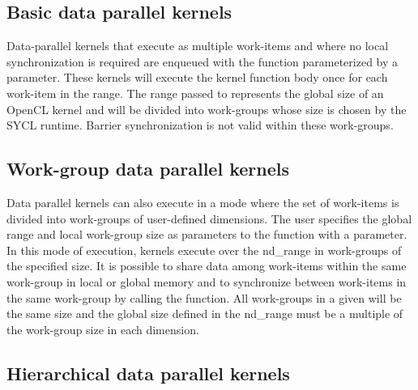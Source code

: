 \subsection{Basic data parallel kernels} 

Data-parallel kernels that execute as
multiple work-items and where no local synchronization is required are enqueued
with the  function parameterized by a
 parameter. These kernels will execute the kernel
function body once for each work-item in the range. The range passed to
 represents the global size of an OpenCL
kernel and will be divided into work-groups whose size is chosen by the SYCL
runtime. Barrier synchronization is not valid within these work-groups.

\subsection{Work-group data parallel kernels}

Data parallel kernels can also execute in a mode where the set of
work-items is divided into work-groups of user-defined dimensions.
The user specifies the global range and local work-group size as
parameters to the  function with a
 parameter. In this mode of execution,
kernels execute over the nd_range in work-groups of the specified
size. It is possible to share data among work-items within the same
work-group in local or global memory and to synchronize between
work-items in the same work-group by calling the 
 function. All work-groups in a given
 will be the same size and the global size
defined in the nd_range must be a multiple of the work-group size in
each dimension.

\subsection{Hierarchical data parallel kernels}

